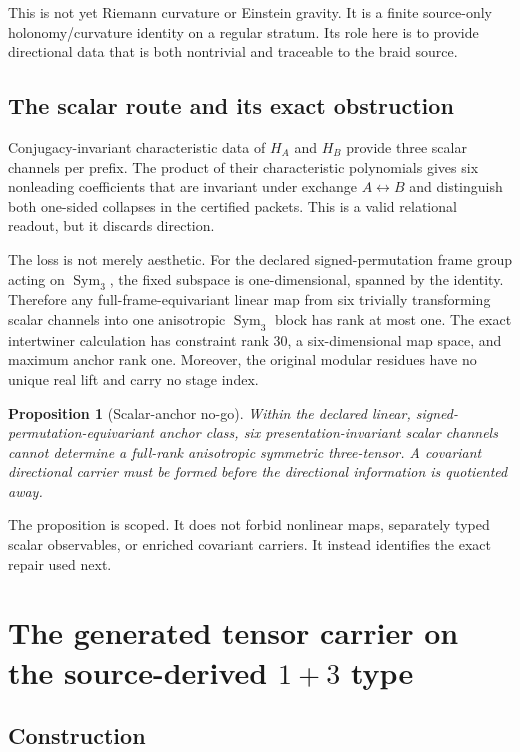 \documentclass[11pt]{article}
\newtheorem{proposition}[theorem]{Proposition}
\theoremstyle{definition}
\theoremstyle{remark}
\newcommand{\Sym}{\operatorname{Sym}}
\begin{document}
This is not yet Riemann curvature or Einstein gravity. It is a finite source-only holonomy/curvature identity on a regular stratum. Its role here is to provide directional data that is both nontrivial and traceable to the braid source.

\subsection{The scalar route and its exact obstruction}

Conjugacy-invariant characteristic data of $H_A$ and $H_B$ provide three scalar channels per prefix. The product of their characteristic polynomials gives six nonleading coefficients that are invariant under exchange $A\leftrightarrow B$ and distinguish both one-sided collapses in the certified packets. This is a valid relational readout, but it discards direction.

The loss is not merely aesthetic. For the declared signed-permutation frame group acting on $\Sym_3$, the fixed subspace is one-dimensional, spanned by the identity. Therefore any full-frame-equivariant linear map from six trivially transforming scalar channels into one anisotropic $\Sym_3$ block has rank at most one. The exact intertwiner calculation has constraint rank 30, a six-dimensional map space, and maximum anchor rank one. Moreover, the original modular residues have no unique real lift and carry no stage index.

\begin{proposition}[Scalar-anchor no-go]\label{prop:nogo}
Within the declared linear, signed-permutation-equivariant anchor class, six presentation-invariant scalar channels cannot determine a full-rank anisotropic symmetric three-tensor. A covariant directional carrier must be formed before the directional information is quotiented away.
\end{proposition}

The proposition is scoped. It does not forbid nonlinear maps, separately typed scalar observables, or enriched covariant carriers. It instead identifies the exact repair used next.

\section{The generated tensor carrier on the source-derived $1+3$ type}

\subsection{Construction}
\end{document}
